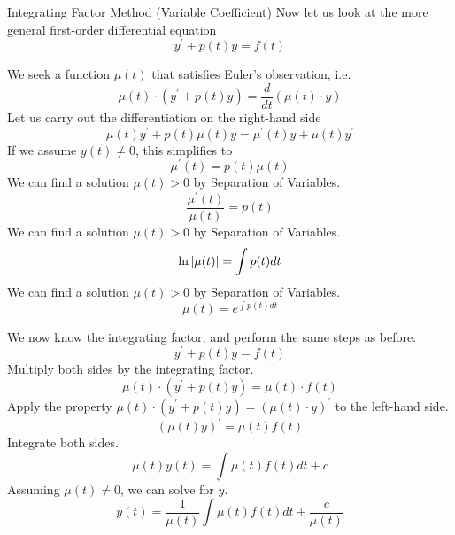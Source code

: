 \documentclass{beamer}
\begin{document}
\begin{frame}
\begin{block}{Integrating Factor Method (Variable Coefficient)}
Now let us look at the more general first-order differential equation
\begin{equation*}
y^\prime + p(t) y = f(t)
\end{equation*}
\begin{overprint}
We seek a function $\mu(t)$ that satisfies Euler's observation, i.e.
\begin{equation*}
\mu(t)\cdot\left(y^\prime + p(t) y\right) = \dfrac{d}{dt}\left(\mu(t)\cdot y\right)
\end{equation*}
Let us carry out the differentiation on the right-hand side
\begin{equation*}
\mu(t) y^\prime + p(t)\mu(t) y = \mu^\prime (t) y + \mu(t) y^\prime
\end{equation*}
If we assume $y(t)\neq 0$, this simplifies to
\begin{equation*}
\mu^\prime (t) = p(t)\mu(t)
\end{equation*}
We can find a solution $\mu(t)>0$ by Separation of Variables.
\begin{equation*}
\dfrac{\mu^\prime (t)}{\mu(t)} = p(t)
\end{equation*}
We can find a solution $\mu(t)>0$ by Separation of Variables.
\begin{equation*}
\ln\abs{\mu(t)} = \int p(t) dt
\end{equation*}
We can find a solution $\mu(t)>0$ by Separation of Variables.
\begin{equation*}
\mu(t) = e^{\int p(t) dt}
\end{equation*}
\end{overprint}
\begin{overprint}
We now know the integrating factor, and perform the same steps as before.
\begin{equation*}
y^\prime + p(t) y = f(t)
\end{equation*}
Multiply both sides by the integrating factor.
\begin{equation*}
\mu(t)\cdot\left(y^\prime + p(t) y\right) = \mu(t)\cdot f(t)
\end{equation*}
Apply the property $\mu(t)\cdot\left(y^\prime + p(t) y\right) = {\left(\mu(t)\cdot y\right)}^\prime$ to the left-hand side.
\begin{equation*}
{\left(\mu(t) y\right)}^\prime = \mu(t) f(t)
\end{equation*}
Integrate both sides.
\begin{equation*}
\mu(t) y(t) = \int \mu(t) f(t) dt + c
\end{equation*}
Assuming $\mu(t)\neq 0$, we can solve for $y$.
\begin{equation*}
y(t) = \dfrac{1}{\mu(t)} \int \mu(t) f(t) dt + \dfrac{c}{\mu(t)}
\end{equation*}
\end{overprint}
\end{block}
\end{frame}
\end{document}
